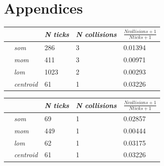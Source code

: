 \documentclass[conference]{IEEEtran}
\begin{document}
\nocite{*}




\newpage

\section{Appendices}


\begin{center}
\begin{tabular}{ | m{2.8em} | m{3em} | m{2.8em} | m{5em} | m{5.2em} | }
\hline
{} & \textit{N ticks} & \textit{N collisions} & $\frac{N collisions + 1}{N ticks + 1}$ \\
\hline
{} & \textit{som} & 286 & 3 & 0.01394 \\
 & \textit{mom} & 411 & 3 & 0.00971 \\
 & \textit{lom} & 1023 & 2 & 0.00293 \\
 & \textit{centroid} & 61 & 1 & 0.03226 \\
\hline
\end{tabular}
\label{table:ps5e1amax}
\end{center}

\begin{center}
\begin{tabular}{ | m{2.8em} | m{3em} | m{2.8em} | m{5em} | m{5.2em} | }
\hline
{} & \textit{N ticks} & \textit{N collisions} & $\frac{N collisions + 1}{N ticks + 1}$ \\
\hline
{} & \textit{som} & 69 & 1 & 0.02857 \\
 & \textit{mom} & 449 & 1 & 0.00444 \\
 & \textit{lom} & 62 & 1 & 0.03175 \\
 & \textit{centroid} & 61 & 1 & 0.03226 \\
\hline
\end{tabular}
\label{table:ps5e1asum}
\end{center}
\end{document}
